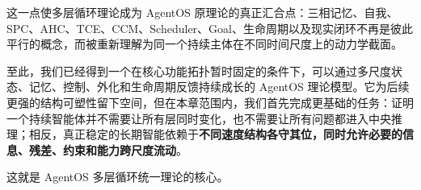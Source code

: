 这一点使多层循环理论成为 AgentOS 原理论的真正汇合点：三相记忆、自我、SPC、AHC、TCE、CCM、Scheduler、Goal、生命周期以及现实闭环不再是彼此平行的概念，而被重新理解为同一个持续主体在不同时间尺度上的动力学截面。

至此，我们已经得到一个在核心功能拓扑暂时固定的条件下，可以通过多尺度状态、记忆、控制、外化和生命周期反馈持续成长的 AgentOS 理论模型。它为后续更强的结构可塑性留下空间，但在本章范围内，我们首先完成更基础的任务：证明一个持续智能体并不需要让所有层同时变化，也不需要让所有问题都进入中央推理；相反，真正稳定的长期智能依赖于\textbf{不同速度结构各守其位，同时允许必要的信息、残差、约束和能力跨尺度流动}。

这就是 AgentOS 多层循环统一理论的核心。
